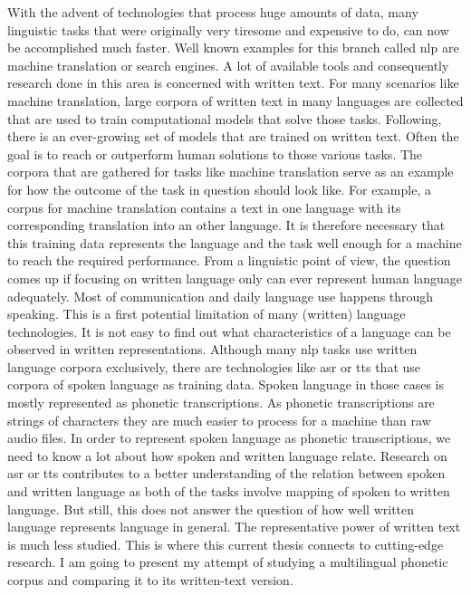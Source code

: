
\label{chap:1_intro}

With the advent of technologies that process huge amounts of data, many linguistic tasks that were originally very tiresome and expensive to do, can now be accomplished much faster. Well known examples for this branch called \ac{nlp} are machine translation or search engines. A lot of available tools and consequently research done in this area is concerned with written text. For many scenarios like machine translation, large corpora of written text in many languages are collected that are used to train computational models that solve those tasks. Following, there is an ever-growing set of models that are trained on written text. Often the goal is to reach or outperform human solutions to those various tasks. The corpora that are gathered for tasks like machine translation serve as an example for how the outcome of the task in question should look like. For example, a corpus for machine translation contains a text in one language with its corresponding translation into an other language. It is therefore necessary that this training data represents the language and the task well enough for a machine to reach the required performance. From a linguistic point of view, the question comes up if focusing on written language only can ever represent human language adequately. Most of communication and daily language use happens through speaking. This is a first potential limitation of many (written) language technologies. It is not easy to find out what characteristics of a language can be observed in written representations. Although many \ac{nlp} tasks use written language corpora exclusively, there are technologies like \ac{asr} or \ac{tts} that use corpora of spoken language as training data. Spoken language in those cases is mostly represented as phonetic transcriptions. As phonetic transcriptions are strings of characters they are much easier to process for a machine than raw audio files. In order to represent spoken language as phonetic transcriptions, we need to know a lot about how spoken and written language relate. Research on \ac{asr} or \ac{tts} contributes to a better understanding of the relation between spoken and written language as both of the tasks involve mapping of spoken to written language. But still, this does not answer the question of how well written language represents language in general. The representative power of written text is much less studied. This is where this current thesis connects to cutting-edge research. I am going to present my attempt of studying a multilingual phonetic corpus and comparing it to its written-text version. 



